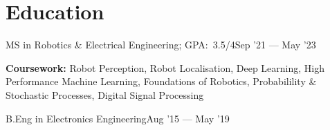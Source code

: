 \section{Education}
\SubHeadingListStart{}

{MS in Robotics \& Electrical Engineering;  GPA:\ 3.5/4}{Sep '21 --- May '23}
{ \item[]\footnotesize{\textbf{Coursework:} Robot Perception, Robot Localisation, Deep Learning, High Performance Machine Learning, 
Foundations of Robotics, Probabilility \& Stochastic Processes, Digital Signal Processing} \vspace{-4pt}}

{B.Eng in Electronics Engineering}{Aug '15 --- May '19}

\SubHeadingListEnd{}{}{}
